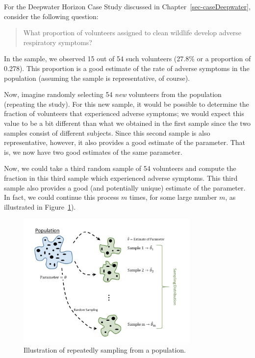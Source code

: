 \documentclass[
  letterpaper,
  DIV=11,
  numbers=noendperiod]{scrreprt}
\theoremstyle{definition}
\theoremstyle{definition}
\theoremstyle{plain}
\theoremstyle{remark}
\begin{document}
For the Deepwater Horizon Case Study discussed in
Chapter~\ref{sec-caseDeepwater}, consider the following question:

\begin{quote}
What proportion of volunteers assigned to clean wildlife develop adverse
respiratory symptoms?
\end{quote}

In the sample, we observed 15 out of 54 such volunteers (27.8\% or a
proportion of 0.278). This proportion is a good estimate of the rate of
adverse symptoms in the population (assuming the sample is
representative, of course).

Now, imagine randomly selecting 54 \emph{new} volunteers from the
population (repeating the study). For this new sample, it would be
possible to determine the fraction of volunteers that experienced
adverse symptoms; we would expect this value to be a bit different than
what we obtained in the first sample since the two samples consist of
different subjects. Since this second sample is also representative,
however, it also provides a good estimate of the parameter. That is, we
now have two good estimates of the same parameter.

Now, we could take a third random sample of 54 volunteers and compute
the fraction in this third sample which experienced adverse symptoms.
This third sample also provides a good (and potentially unique) estimate
of the parameter. In fact, we could continue this process \(m\) times,
for some large number \(m\), as illustrated in
Figure~\ref{fig-samplingdistns-sampling-distribution}).

\begin{figure}

{\centering \includegraphics[width=0.8\textwidth,height=\textheight]{./images/SamplingDistns-Sampling-Distribution.jpg}

}

\caption{\label{fig-samplingdistns-sampling-distribution}Illustration of
repeatedly sampling from a population.}

\end{figure}
\end{document}
